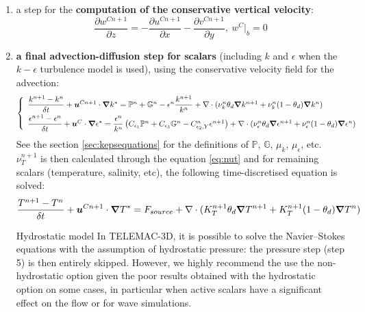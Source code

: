 \begin{enumerate}
\item a step for the \textbf{computation of the conservative vertical velocity}:
\begin{equation}
  \dfrac{\partial w^{Cn+1}}{\partial z}=-\dfrac{\partial u^{Cn+1}}{\partial x}-\dfrac{\partial v^{Cn+1}}{\partial y}, ~w^{C}|_b=0
\end{equation}
\item \textbf{a final advection-diffusion step for scalars} 
(including $k$ and $\epsilon$ when the $k-\epsilon$ turbulence model is used), 
using the conservative velocity field for the advection:
\begin{equation}\label{eq:keps_discreteTime}
  \left\{
    \begin{array}{l}
      \dfrac{k^{n+1}-k^n}{\delta t} +\vec{u}^{Cn+1}\cdot\Grad k^{*}= \mathbb{P}^n + \mathbb{G}^n - \epsilon^n \dfrac{k^{n+1}}{k^n} + \Div(\nu_{k}^n\theta_d\Grad k^{n+1}+\nu_{k}^n(1-\theta_d)\Grad k^{n}) \smallskip \\
      \dfrac{\epsilon^{n+1}-\epsilon^n}{\delta t} +\vec{u}^C\cdot\Grad \epsilon^{*}= \dfrac{\epsilon^n}{k^n}\left(C_{\epsilon_1}\mathbb{P}^n
        +C_{\epsilon_3}\mathbb{G}^n-C_{\epsilon_2,Y}^n\epsilon^{n+1}\right)+\Div(\nu_{\epsilon}^n\theta_d\Grad \epsilon^{n+1}+\nu_{\epsilon}^n(1-\theta_d)\Grad \epsilon^n)
    \end{array}
  \right.
\end{equation}
See the section \ref{sec:kepsequations} for the definitions of $\mathbb{P}$, $\mathbb{G}$, $\mu_{k}$, $\mu_{\epsilon}$, etc. 
$\nu_T^{n+1}$ is then calculated through the equation \eqref{eq:nut} 
and for remaining scalars (temperature, salinity, etc), the following time-discretised equation is solved:
\begin{equation}
  \dfrac{T^{n+1}-T^n}{\delta t}+\bm{u}^{Cn+1}\cdot\bm{\nabla} T^{*} = F_{source}+\nabla \cdot(K_T^{n+1}\theta_d\bm{\nabla} T^{n+1}+K_T^{n+1}(1-\theta_d)\bm{\nabla} T^n)
\end{equation}


\begin{CommentBlock}{Hydrostatic model}
In TELEMAC-3D, it is possible to solve the Navier--Stokes equations with the assumption 
of hydrostatic pressure: the pressure step (step 5) is then entirely skipped.
However, we highly recommend the use the non-hydrostatic option given the poor results
obtained with the hydrostatic option on some cases, in particular when active scalars have a significant
effect on the flow or for wave simulations.
\end{CommentBlock}
\end{enumerate}

